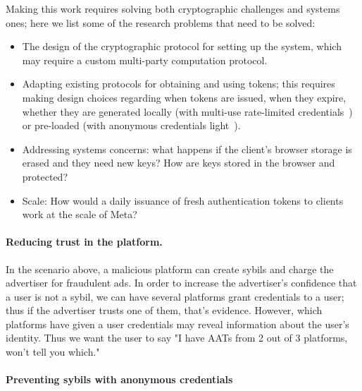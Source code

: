 Making this work requires solving both cryptographic challenges and systems ones; here we list some of the research problems that need to be solved:
\begin{itemize}[nosep]
\item The design of the cryptographic protocol for setting up the system, which may require a custom multi-party computation protocol.
\item Adapting existing protocols for obtaining and using tokens; this requires making design choices regarding when tokens are issued, when they expire, whether they are generated locally (with multi-use rate-limited credentials~\cite{chklm06}) or pre-loaded (with anonymous credentials light~\cite{CCS:ballys13}).
\item Addressing systems concerns: what happens if the client’s browser storage is erased and they need new keys? How are keys stored in the browser and protected?
\item Scale: How would a daily issuance of fresh authentication tokens to clients work at the scale of Meta?
\end{itemize}


\paragraph{Reducing trust in the platform.}
In the scenario above, a malicious platform can create sybils and charge the advertiser for fraudulent ads.  In order to increase the advertiser's confidence that a user is not a sybil, we can have several platforms grant credentials to a user; thus if the advertiser trusts one of them, that's evidence.  However, which platforms have given a user credentials may reveal information about the user's identity.  Thus we want the user to say "I have AATs from 2 out of 3 platforms, won't tell you which."

\paragraph{Preventing sybils with anonymous credentials} 



